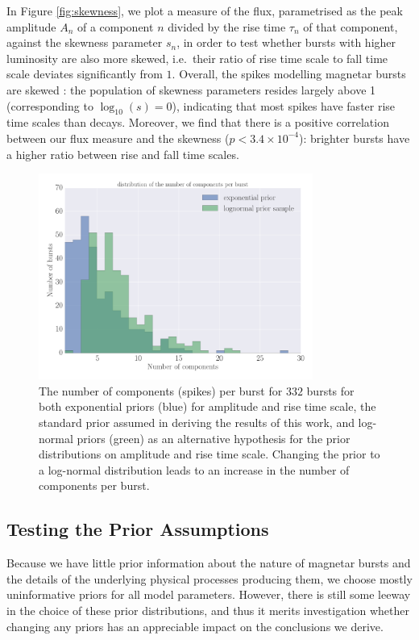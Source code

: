 \documentclass[12pt]{emulateapj}
\begin{document}
In Figure \ref{fig:skewness}, we plot a measure of the flux, parametrised as the peak amplitude $A_n$ of a component $n$ divided by the rise time $\tau_n$ of that component,
against the skewness parameter $s_n$, in order to test whether bursts with higher luminosity are also more skewed, i.e.\ their ratio of rise time scale to fall time scale deviates significantly
from $1$. Overall, the spikes modelling magnetar bursts are skewed \citep[see also ][]{gogus1999,vanderhorst2012}: the population of 
skewness parameters resides largely above 1 (corresponding to $\log_{10}{(s)} = 0$), indicating that most
spikes have faster rise time scales than decays. Moreover, we find that there is a positive correlation between our flux measure and the skewness ($ p < 3.4 × 10^{−4}$): brighter bursts have a higher
ratio between rise and fall time scales. 

 \begin{figure}[htbp]
\begin{center}
\includegraphics[width=9cm]{f11.pdf}%
\caption{The number of  components (spikes) per burst for $332$ bursts for both exponential priors (blue) for amplitude and rise time scale, the standard prior assumed in
deriving the results of this work, and log-normal priors (green) as an alternative hypothesis for the prior distributions on amplitude and rise time scale. Changing the prior to a log-normal
distribution leads to an increase in the number of components per burst.}
\label{fig:nspikes_prior}
\end{center}
\end{figure}



\subsection{Testing the Prior Assumptions}
\label{ch6:priortest}
Because we have little prior information about the nature of magnetar bursts and the details of
the underlying physical processes producing them, we choose mostly uninformative priors for all model parameters. However,
there is still some leeway in the choice of these prior distributions, and thus it merits investigation whether changing
any priors has an appreciable impact on the conclusions we derive. 
\end{document}

